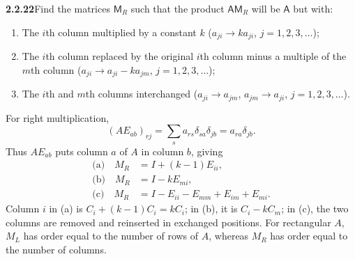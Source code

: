 \par\bigskip
\noindent\textbf{2.2.22}\quad Find the matrices $\mathsf{M}_{R}$ such that the
product $\mathsf{AM}_{R}$ will be $\mathsf{A}$ but with:
\begin{enumerate}
\item[(a)] The $i$th column multiplied by a constant $k$ ($a_{ji}\to ka_{ji}$,
  $j=1,2,3,\ldots$);
\item[(b)] The $i$th column replaced by the original $i$th column minus a
  multiple of the $m$th column ($a_{ji}\to a_{ji}-ka_{jm}$, $j=1,2,3,\ldots$);
\item[(c)] The $i$th and $m$th columns interchanged ($a_{ji}\to a_{jm}$,
  $a_{jm}\to a_{ji}$, $j=1,2,3,\ldots$).
\end{enumerate}
\solution
For right multiplication,
\[
(AE_{ab})_{rj}=\sum_s a_{rs}\delta_{sa}\delta_{jb}
=a_{ra}\delta_{jb}.
\]
Thus $AE_{ab}$ puts column $a$ of $A$ in column $b$, giving
\[
\boxed{\begin{aligned}
\text{(a)}\quad M_R&=I+(k-1)E_{ii},\\
\text{(b)}\quad M_R&=I-kE_{mi},\\
\text{(c)}\quad M_R&=I-E_{ii}-E_{mm}+E_{im}+E_{mi}.
\end{aligned}}
\]
Column $i$ in (a) is $C_i+(k-1)C_i=kC_i$; in (b), it is
$C_i-kC_m$; in (c), the two columns are removed and reinserted
in exchanged positions.
For rectangular $A$, $M_L$ has order equal to the number of rows
of $A$, whereas $M_R$ has order equal to the number of columns.

